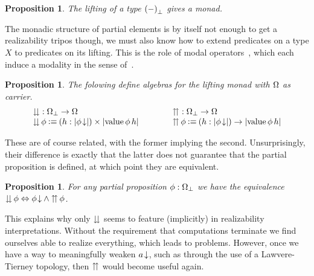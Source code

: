 \documentclass[11pt]{article}
\newtheorem{prop}[thrm]{Proposition}
\begin{document}
\begin{prop}
  The lifting of a type \({(-)}_\bot\) gives a monad.
\end{prop}

The monadic structure of partial elements is by itself not enough to get
a realizability tripos though, we must also know how to extend predicates on
a type \(X\) to predicates on its lifting.
%
This is the role of modal operators~\cite{moggiNotionsComputationMonads1991},
which each induce a modality in the sense
of~\cite{cohenPartialMonadicCombinatory2025}.

\begin{prop}
  The folowing define algebras for the lifting monad
  with \(\Omega\) as carrier.
  \[\arraycolsep=2em
    \begin{array}{ll}
      \ISquashSym : \IPar{\IProp} \to \IProp
      &
        \ISquishSym : \IPar{\IProp} \to \IProp
      \\
      \ISquash{\phi} \IsDefined \IProd{(h:\IHolds{\ITotal{\phi}})}{\IHolds{\IVal{\phi}\,h}}
      &
        \ISquish{\phi} \IsDefined \IFun{(h:\IHolds{\ITotal{\phi}})}{\IHolds{\IVal{\phi}\,h}}
    \end{array}
  \]
\end{prop}

These are of course related, with the former implying the second.
%
Unsurprisingly, their difference is exactly that the latter does not guarantee
that the partial proposition is defined, at which point they are equivalent.

\begin{prop}\label{prop:squash-and-squish}
  For any partial proposition \(\phi:{\Omega}_\bot\) we have the equivalence
  \({{\downdownarrows}\,{\phi}}\Leftrightarrow{{{{\phi}\!\downarrow}}\land{{\upuparrows}\,{\phi}}}\).
\end{prop}

This explains why only \({\downdownarrows}\) seems to feature (implicitly) in
realizability interpretations.
%
Without the requirement that computations terminate we find ourselves able to
realize everything, which leads to problems.
%
However, once we have a way to meaningfully weaken \({{a}\!\downarrow}\), such as
through the use of a Lawvere-Tierney topology, then \({\upuparrows}\) would become
useful again.
\end{document}
